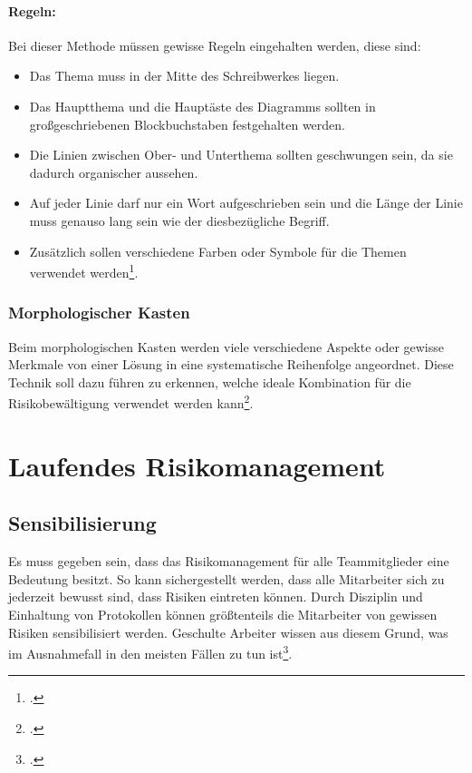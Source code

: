\paragraph{Regeln:} Bei dieser Methode müssen gewisse Regeln eingehalten werden, diese sind:
\begin{itemize}
	\item Das Thema muss in der Mitte des Schreibwerkes liegen.
	\item Das Hauptthema und die Hauptäste des Diagramms sollten in großgeschriebenen Blockbuchstaben festgehalten werden.
	\item Die Linien zwischen Ober- und Unterthema sollten geschwungen sein, da sie dadurch organischer aussehen.
	\item Auf jeder Linie darf nur ein Wort aufgeschrieben sein und die Länge der Linie muss genauso lang sein wie der diesbezügliche Begriff.
	\item Zusätzlich sollen verschiedene Farben oder Symbole für die Themen verwendet werden\footcite{risikomanagement-diplomarbeit-methoden}.
\end{itemize}

\subsubsection{Morphologischer Kasten}
Beim morphologischen Kasten werden viele verschiedene Aspekte oder gewisse Merkmale von einer Lösung in eine systematische Reihenfolge angeordnet. Diese Technik soll dazu führen zu erkennen, welche ideale Kombination für die Risikobewältigung verwendet werden kann\footcite{risikomanagement-diplomarbeit-methoden}.

\newpage
\section{Laufendes Risikomanagement}
\subsection{Sensibilisierung}
Es muss gegeben sein, dass das Risikomanagement für alle Teammitglieder eine Bedeutung besitzt. So kann sichergestellt werden, dass alle Mitarbeiter sich zu jederzeit bewusst sind, dass Risiken eintreten können. Durch Disziplin und Einhaltung von Protokollen können größtenteils die Mitarbeiter von gewissen Risiken sensibilisiert werden. Geschulte Arbeiter wissen aus diesem Grund, was im Ausnahmefall in den meisten Fällen zu tun ist\footcite{bva-risikomanagement}.


